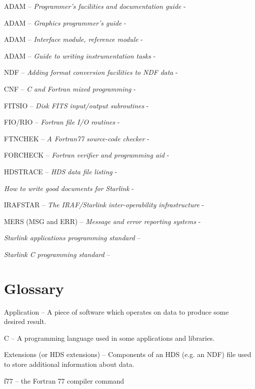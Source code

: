 ADAM -- {\em Programmer's facilities and documentation guide} - 

ADAM -- {\em Graphics programmer's guide} - 

ADAM -- {\em Interface module, reference module} - 

ADAM -- {\em Guide to writing instrumentation tasks} - 

NDF -- {\em Adding format conversion facilities to NDF data} -

CNF -- {\em C and Fortran mixed programming} - 

FITSIO -- {\em Disk FITS input/output subroutines} - 

FIO/RIO -- {\em Fortran file I/O routines} - 

FTNCHEK -- {\em A Fortran77 source-code checker} - 

FORCHECK -- {\em Fortran verifier and programming aid} - 

HDSTRACE -- {\em HDS data file listing}  - 

{\em How to write good documents for Starlink} - 

IRAFSTAR -- {\em The IRAF/Starlink inter-operability infrastructure} -

MERS (MSG and ERR) -- {\em Message and error reporting systems} -

{\em Starlink applications programming standard} -- 

{\em Starlink C programming standard} -- 

\section{Glossary}

{\sf Application} -- A piece of software which operates on data to
produce some desired result.

{\sf C} -- A programming language used in some applications and libraries. 

{\sf Extensions (or HDS extensions)} -- Components of an HDS (e.g. an
NDF) file used to store additional information about data.

{\sf f77} -- the Fortran 77 compiler command

